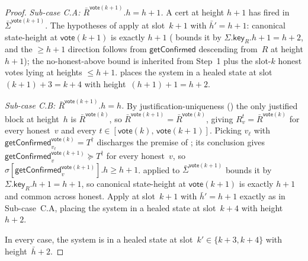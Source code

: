\documentclass{article}
\newcommand{\key}{\mathsf{key}}
\newcommand{\vote}{\mathsf{vote}}
\newcommand{\comm}[1]{\bar{#1}}
\newcommand{\getConfirmed}{\textsf{getConfirmed}\xspace}
\theoremstyle{plain}
\theoremstyle{definition}
\theoremstyle{remark}
\begin{document}
\begin{proof}
\emph{Sub-case C.A: $\comm{R}^{\vote(k+1)}.h = h+1$.}
A cert at height $h+1$ has fired in $\comm{\Sigma}^{\vote(k+1)}$. The hypotheses of  apply at slot~$k+1$ with $\comm{h}' = h+1$: canonical state-height at $\vote(k+1)$ is exactly $h+1$ ( bounds it by $\Sigma.\key_R.h + 1 = h+2$, and the $\geq h+1$ direction follows from $\getConfirmed$ descending from~$R$ at height $h+1$); the no-honest-above bound is inherited from Step~1 plus the slot-$k$ honest votes lying at heights $\leq h+1$.  places the system in a healed state at slot~$(k+1)+3 = k+4$ with height~$(h+1)+1 = h+2$.

\emph{Sub-case C.B: $\comm{R}^{\vote(k+1)}.h = h$.}
By justification-uniqueness () the only justified block at height~$h$ is $\comm{R}^{\vote(k)}$, so $\comm{R}^{\vote(k+1)} = \comm{R}^{\vote(k)}$, giving $R_v^t = \comm{R}^{\vote(k)}$ for every honest~$v$ and every $t \in [\vote(k),\, \vote(k+1)]$. Picking $v_\ell$ with $\getConfirmed_{v_\ell}^{\vote(k)} = T^\dagger$ discharges the premise of ; its conclusion gives $\getConfirmed_v^{\vote(k+1)} \succeq T^\dagger$ for every honest~$v$, so $\sigma[\getConfirmed_v^{\vote(k+1)}].h \geq h + 1$.  applied to $\comm{\Sigma}^{\vote(k+1)}$ bounds it by $\Sigma.\key_R.h + 1 = h + 1$, so canonical state-height at $\vote(k+1)$ is exactly $h+1$ and common across honest. Apply  at slot~$k+1$ with $\comm{h}' = h+1$ exactly as in Sub-case~C.A, placing the system in a healed state at slot~$k+4$ with height~$h+2$.

In every case, the system is in a healed state at slot~$k' \in \{k+3, k+4\}$ with height~$\comm{h}+2$.
\end{proof}
\end{document}
